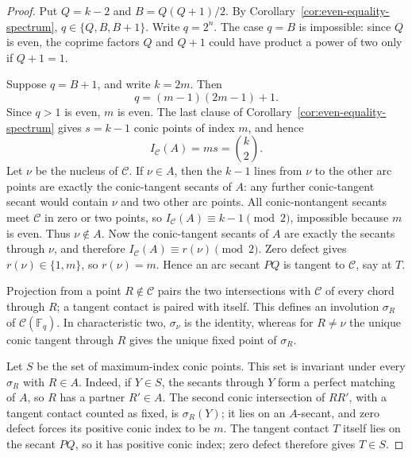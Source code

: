 \documentclass[11pt]{article}
\theoremstyle{definition}
\theoremstyle{remark}
\newcommand{\F}{\mathbb{F}}
\newcommand{\cC}{\mathcal{C}}
\newcommand{\IC}{I_{\cC}}
\begin{document}
\begin{proof}
Put \(Q=k-2\) and \(B=Q(Q+1)/2\).  By
Corollary~\ref{cor:even-equality-spectrum},
\(q\in\{Q,B,B+1\}\).  Write \(q=2^n\).
The case \(q=B\) is impossible: since
\(Q\) is even, the coprime factors \(Q\) and \(Q+1\) could have product
a power of two only if \(Q+1=1\).

Suppose \(q=B+1\), and write \(k=2m\).  Then
\[
 q=(m-1)(2m-1)+1.
\]
Since \(q>1\) is even, \(m\) is even.  The last clause of
Corollary~\ref{cor:even-equality-spectrum} gives \(s=k-1\) conic points
of index \(m\), and hence
\[
 \IC(A)=ms=\binom{k}{2}.
\]
Let \(\nu\) be the nucleus of \(\cC\).  If \(\nu\in A\), then
the \(k-1\) lines from \(\nu\) to the other arc points are exactly the
conic-tangent secants of \(A\): any further conic-tangent secant would
contain \(\nu\) and two other arc points.  All conic-nontangent secants
meet \(\cC\) in zero or two points, so
\(\IC(A)\equiv k-1\pmod2\), impossible because \(m\) is even.  Thus
\(\nu\notin A\).  Now the conic-tangent secants of \(A\) are exactly the
secants through \(\nu\), and therefore
\(\IC(A)\equiv r(\nu)\pmod2\).  Zero defect gives
\(r(\nu)\in\{1,m\}\), so \(r(\nu)=m\).  Hence an arc secant
\(PQ\) is tangent to \(\cC\), say at \(T\).

Projection from a point \(R\notin\cC\) pairs the two intersections with
\(\cC\) of every chord through \(R\); a tangent contact is paired with
itself.  This defines an involution \(\sigma_R\) of
\(\cC(\F_q)\).  In characteristic two, \(\sigma_\nu\) is the identity,
whereas for \(R\ne\nu\) the unique conic tangent through \(R\) gives the
unique fixed point of \(\sigma_R\).

Let \(S\) be the set of maximum-index conic points.  This set is invariant
under every \(\sigma_R\) with \(R\in A\).  Indeed, if \(Y\in S\), the
secants through \(Y\) form a perfect matching of \(A\), so \(R\) has a
partner \(R'\in A\).  The second conic intersection of \(RR'\), with a
tangent contact counted as fixed, is \(\sigma_R(Y)\); it lies on an
\(A\)-secant, and zero defect forces its positive conic index to be \(m\).
The tangent contact \(T\) itself lies on the secant \(PQ\), so it has
positive conic index; zero defect therefore gives \(T\in S\).


\end{proof}
\end{document}
